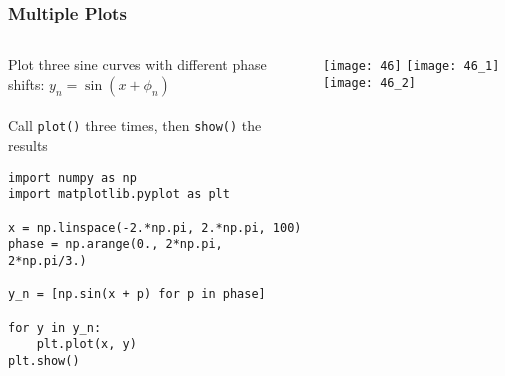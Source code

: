 \begin{frame}[fragile]\frametitle{Multiple Plots}

\begin{columns}
    \begin{column}[T]{0.6\linewidth}

    Plot three sine curves with different phase shifts:
    $y_n = \sin(x + \phi_n)$
    \\~\\
    Call \lstinline|plot()| three times, then \lstinline|show()| the results
    \begin{lstlisting}
import numpy as np
import matplotlib.pyplot as plt

x = np.linspace(-2.*np.pi, 2.*np.pi, 100)
phase = np.arange(0., 2*np.pi, 2*np.pi/3.)

y_n = [np.sin(x + p) for p in phase]

for y in y_n:
    plt.plot(x, y)
plt.show()
    \end{lstlisting}

    \end{column}
    \begin{column}[T]{0.4\linewidth}

\begin{center}
\texttt{[image: 46]}
\texttt{[image: 46\_1]}
\texttt{[image: 46\_2]}
\end{center}

    \end{column}
  \end{columns}
  
  
  


\end{frame}

